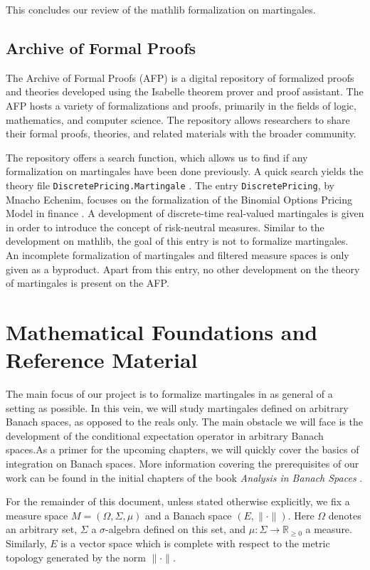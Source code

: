 This concludes our review of the \textsf{mathlib} formalization on martingales.

\subsection{Archive of Formal Proofs}

The Archive of Formal Proofs (\textsf{AFP}) is a digital repository of formalized proofs and theories developed using the Isabelle theorem prover and proof assistant. The \textsf{AFP}  hosts a variety of formalizations and proofs, primarily in the fields of logic, mathematics, and computer science. The repository allows researchers to share their formal proofs, theories, and related materials with the broader community.

The repository offers a search function, which allows us to find if any formalization on martingales have been done previously. A quick search yields the theory file \texttt{DiscretePricing.Martingale} \cite{DiscretePricing-AFP}. The entry \texttt{DiscretePricing}, by Mnacho Echenim, focuses on the formalization of the Binomial Options Pricing Model in finance \cite{EchenimPeltier}. A development of discrete-time real-valued martingales is given in order to introduce the concept of risk-neutral measures. Similar to the development on \textsf{mathlib}, the goal of this entry is not to formalize martingales. An incomplete formalization of martingales and filtered measure spaces is only given as a byproduct.
Apart from this entry, no other development on the theory of martingales is present on the \textsf{AFP}.

\section{Mathematical Foundations and Reference Material}

The main focus of our project is to formalize martingales in as general of a setting as possible. In this vein, we will study martingales defined on arbitrary Banach spaces, as opposed to the reals only. The main obstacle we will face is the development of the conditional expectation operator in arbitrary Banach spaces.As a primer for the upcoming chapters, we will quickly cover the basics of integration on Banach spaces. More information covering the prerequisites of our work can be found in the initial chapters of the book \textit{Analysis in Banach Spaces} \cite{Hytoenen_2016}.

\begin{remark}
	For the remainder of this document, unless stated otherwise explicitly, we fix a measure space $M = (\Omega, \Sigma, \mu)$ and a Banach space $(E, \lVert \cdot \rVert)$. Here $\Omega$ denotes an arbitrary set, $\Sigma$ a $\sigma$-algebra defined on this set, and $\mu : \Sigma \rightarrow \mathbb{R}_{\ge 0}$ a measure. Similarly, $E$ is a vector space which is complete with respect to the metric topology generated by the norm $\lVert \cdot \rVert$.
\end{remark}

